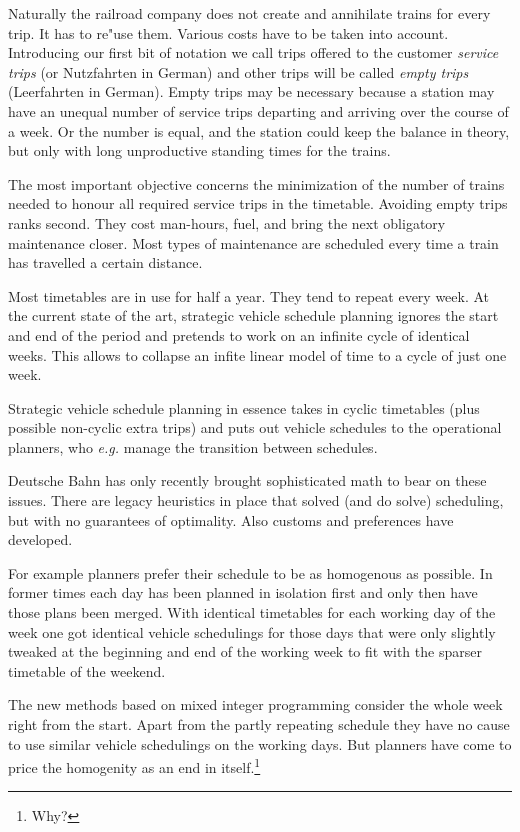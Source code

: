 \documentclass[a4paper]{amsart} %
\def\eg{\emph{e.g.}}
\newcommand{\todo}[1]{\footnote{#1}}
\begin{document}
Naturally the railroad company does not create and annihilate trains
for every trip.  It has to re"use them.  Various costs have to be
taken into account.  Introducing our first bit of notation we call
trips offered to the customer \textit{service trips} (or Nutzfahrten
in German) and other trips will be called \textit{empty trips}
(Leerfahrten in German).  Empty trips may be necessary because a
station may have an unequal number of service trips departing and
arriving over the course of a week.  Or the number is equal, and the
station could keep the balance in theory, but only with long
unproductive standing times for the trains.

The most important objective concerns the minimization of the number
of trains needed to honour all required service trips in the
timetable.  Avoiding empty trips ranks second.  They cost man-hours,
fuel, and bring the next obligatory maintenance closer.  Most types of
maintenance are scheduled every time a train has travelled a certain
distance.

Most timetables are in use for half a year.  They tend to repeat every
week.  At the current state of the art, strategic vehicle schedule
planning ignores the start and end of the period and pretends to work
on an infinite cycle of identical weeks.  This allows to collapse an
infite linear model of time to a cycle of just one week.

Strategic vehicle schedule planning in essence takes in cyclic
timetables (plus possible non-cyclic extra trips) and puts out vehicle
schedules to the operational planners, who \eg{} manage the transition
between schedules.

Deutsche Bahn has only recently brought sophisticated math to bear on
these issues.  There are legacy heuristics in place that solved (and
do solve) scheduling, but with no guarantees of optimality.  Also
customs and preferences have developed.

For example planners prefer their schedule to be as homogenous as
possible.  In former times each day has been planned in isolation
first and only then have those plans been merged.  With identical
timetables for each working day of the week one got identical vehicle
schedulings for those days that were only slightly tweaked at the
beginning and end of the working week to fit with the sparser
timetable of the weekend.

The new methods based on mixed integer programming consider the whole
week right from the start.  Apart from the partly repeating schedule
they have no cause to use similar vehicle schedulings on the working
days.  But planners have come to price the homogenity as an end in
itself.\todo{Why?}
\end{document}
